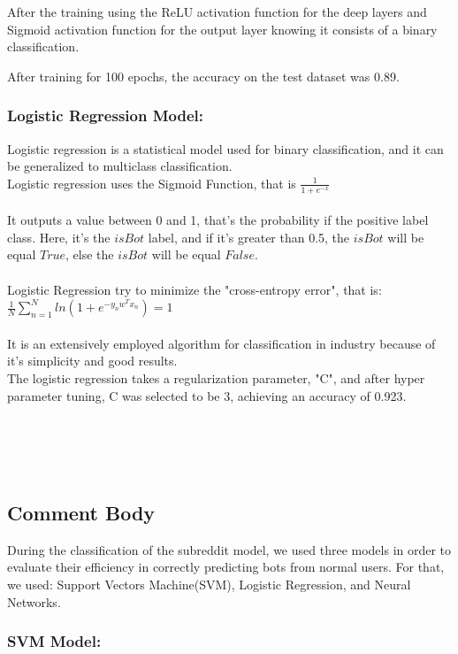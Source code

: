 \documentclass{article}
\begin{document}
    After the training using the ReLU activation function for the deep layers and Sigmoid activation function for the output layer knowing it consists of a binary classification.
    
    After training for 100 epochs, the accuracy on the test dataset was 0.89.
    
    \subsubsection{Logistic Regression Model:}
    
    Logistic regression is a statistical model used for binary classification, and it can be generalized to multiclass classification. \\
Logistic regression uses the Sigmoid Function, that is $\frac{1}{1+e^{-x}}$\\ \\ It outputs a value between 0 and 1, that's the probability if the positive label class. Here, it's the $isBot$ label, and if it's greater than 0.5, the $isBot$ will be equal $True$, else the $isBot$ will be equal $False$.  \\ \\
Logistic Regression try to minimize the "cross-entropy error", that is:\\ $\frac{1}{N} \sum_{n=1}^{N} ln(1 + e^ {-y_{n}w^Tx_n}) = 1$\\ \\
It is an extensively employed algorithm for classification in industry because of it's simplicity and good results. \\
The logistic regression takes a regularization parameter, "C", and after hyper parameter tuning, C was selected to be 3, achieving an accuracy of 0.923.  \\ \\ \\ \\ \\ 
    \subsection{Comment Body}
    During the classification of  the subreddit model, we used three models in order to evaluate their efficiency in correctly predicting bots from normal users. For that, we used: Support Vectors Machine(SVM), Logistic Regression, and Neural Networks.
    
    \subsubsection{SVM Model:}
    
\end{document}
